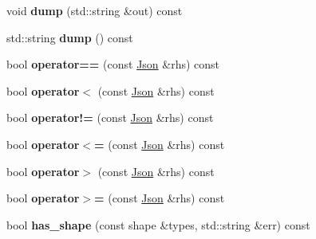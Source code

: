 \begin{DoxyCompactItemize}
void {\bfseries dump} (std\+::string \&out) const
\item 
\mbox{\label{classjson11_1_1_json_a65aad4271963eeb2688ebdbd152ea307}} 
std\+::string {\bfseries dump} () const
\item 
\mbox{\label{classjson11_1_1_json_aad1799d488dab7f0851f7bce9c86799f}} 
bool {\bfseries operator==} (const \mbox{\hyperlink{classjson11_1_1_json}{Json}} \&rhs) const
\item 
\mbox{\label{classjson11_1_1_json_a24c4567a90be32f09b4d50b1eb03f718}} 
bool {\bfseries operator$<$} (const \mbox{\hyperlink{classjson11_1_1_json}{Json}} \&rhs) const
\item 
\mbox{\label{classjson11_1_1_json_ae616cea26e94189e92a8497cc0a0b344}} 
bool {\bfseries operator!=} (const \mbox{\hyperlink{classjson11_1_1_json}{Json}} \&rhs) const
\item 
\mbox{\label{classjson11_1_1_json_a919b9365d6a28290d7c1414224138350}} 
bool {\bfseries operator$<$=} (const \mbox{\hyperlink{classjson11_1_1_json}{Json}} \&rhs) const
\item 
\mbox{\label{classjson11_1_1_json_a85add86873a842bce861badecfeff652}} 
bool {\bfseries operator$>$} (const \mbox{\hyperlink{classjson11_1_1_json}{Json}} \&rhs) const
\item 
\mbox{\label{classjson11_1_1_json_aa39a4415c003f166ed03753cd2ba0731}} 
bool {\bfseries operator$>$=} (const \mbox{\hyperlink{classjson11_1_1_json}{Json}} \&rhs) const
\item 
\mbox{\label{classjson11_1_1_json_ac556cd94b6c2e30fcb35714cc42ac47e}} 
bool {\bfseries has\+\_\+shape} (const shape \&types, std\+::string \&err) const
\end{DoxyCompactItemize}
